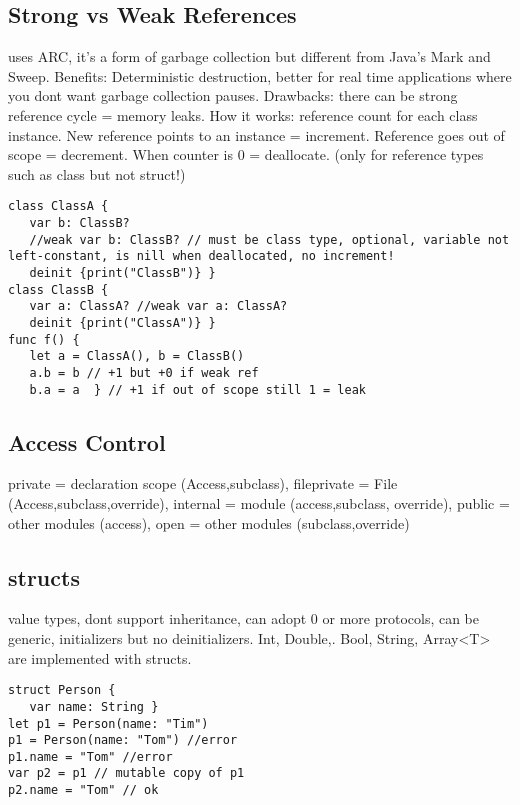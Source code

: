 \subsection{Strong vs Weak References}
uses ARC, it's a form of garbage collection but different from Java's Mark and Sweep. Benefits: Deterministic destruction, better for real time applications where you dont want garbage collection pauses. Drawbacks: there can be strong reference cycle = memory leaks.
How it works: reference count for each class instance. New reference points to an instance = increment. Reference goes out of scope = decrement. When counter is 0 = deallocate. (only for reference types such as class but not struct!)
\begin{lstlisting}
class ClassA {
   var b: ClassB?
   //weak var b: ClassB? // must be class type, optional, variable not left-constant, is nill when deallocated, no increment!
   deinit {print("ClassB")} }
class ClassB {
   var a: ClassA? //weak var a: ClassA?
   deinit {print("ClassA")} }
func f() {
   let a = ClassA(), b = ClassB()
   a.b = b // +1 but +0 if weak ref
   b.a = a  } // +1 if out of scope still 1 = leak
\end{lstlisting}

\subsection{Access Control}
private = declaration scope (Access,subclass), fileprivate = File (Access,subclass,override), internal = module (access,subclass, override), public = other modules (access), open = other modules (subclass,override)

\subsection{structs}
value types, dont support inheritance, can adopt 0 or more protocols, can be generic, initializers but no deinitializers. Int, Double,. Bool, String, Array<T> are implemented with structs.
\begin{lstlisting}
struct Person {
   var name: String }
let p1 = Person(name: "Tim")
p1 = Person(name: "Tom") //error
p1.name = "Tom" //error
var p2 = p1 // mutable copy of p1
p2.name = "Tom" // ok
\end{lstlisting}

